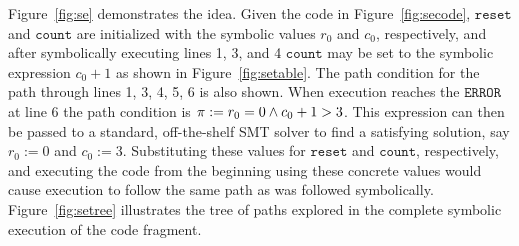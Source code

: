 Figure~\ref{fig:se} demonstrates the idea. 
Given the code in
Figure~\ref{fig:secode}, $\mathtt{reset}$ and $\mathtt{count}$ are initialized
with the symbolic values $r_0$ and $c_0$, respectively, and after symbolically
executing lines 1, 3, and 4 $\mathtt{count}$ may be set to the symbolic expression $c_0 +
1$ as shown in Figure~\ref{fig:setable}. The
path condition for the path through lines 1, 3, 4, 5, 6 is also shown. When execution
reaches the $\mathtt{ERROR}$ at line 6 the path condition is $\pi := r_0
= 0 \wedge c_0 + 1 > 3$. This expression can then be passed to a standard,
off-the-shelf SMT solver to find a satisfying solution, say $r_0 := 0$ and $c_0
:= 3$. Substituting these values for $\mathtt{reset}$ and $\mathtt{count}$,
respectively, and executing the code from the beginning using these concrete
values would cause execution to follow the same path as was followed
symbolically. Figure~\ref{fig:setree} illustrates
the tree of paths explored in the complete symbolic execution of the
code fragment.

